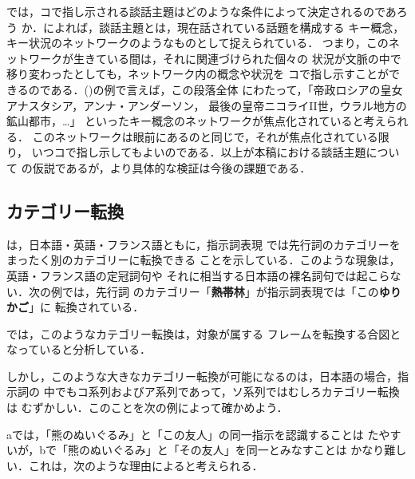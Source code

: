 では，コで指し示される談話主題はどのような条件によって決定されるのであろう
か．によれば，談話主題とは，現在話されている話題を構成する
キー概念，キー状況のネットワークのようなものとして捉えられている．
つまり，このネットワークが生きている間は，それに関連づけられた個々の
状況が文脈の中で移り変わったとしても，ネットワーク内の概念や状況を
コで指し示すことができるのである．()の例で言えば，この段落全体
にわたって，「帝政ロシアの皇女アナスタシア，アンナ・アンダーソン，
最後の皇帝ニコライ{II}世，ウラル地方の鉱山都市，…」
といったキー概念のネットワークが焦点化されていると考えられる．
このネットワークは眼前にあるのと同じで，それが焦点化されている限り，
いつコで指し示してもよいのである．以上が本稿における談話主題について
の仮説であるが，より具体的な検証は今後の課題である．


\subsection{カテゴリー転換}
は，日本語・英語・フランス語ともに，指示詞表現
では先行詞のカテゴリーをまったく別のカテゴリーに転換できる
ことを示している．このような現象は，英語・フランス語の定冠詞句や
それに相当する日本語の裸名詞句では起こらない．次の例では，先行詞
のカテゴリー「{\bf 熱帯林}」が指示詞表現では「この{\bf ゆりかご}」に
転換されている．


では，このようなカテゴリー転換は，対象が属する
フレームを転換する合図となっていると分析している．

しかし，このような大きなカテゴリー転換が可能になるのは，日本語の場合，指示詞の
中でもコ系列およびア系列であって，ソ系列ではむしろカテゴリー転換は
むずかしい．このことを次の例によって確かめよう．


aでは，「熊のぬいぐるみ」と「この友人」の同一指示を認識することは
たやすいが，bで「熊のぬいぐるみ」と「その友人」を同一とみなすことは
かなり難しい．これは，次のような理由によると考えられる．

